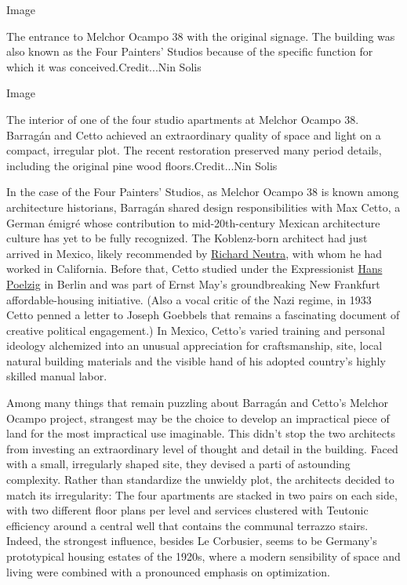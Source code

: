 Image

The entrance to Melchor Ocampo 38 with the original signage. The
building was also known as the Four Painters' Studios because of the
specific function for which it was conceived.Credit...Nin Solis

Image

The interior of one of the four studio apartments at Melchor Ocampo 38.
Barragán and Cetto achieved an extraordinary quality of space and light
on a compact, irregular plot. The recent restoration preserved many
period details, including the original pine wood floors.Credit...Nin
Solis

In the case of the Four Painters' Studios, as Melchor Ocampo 38 is known
among architecture historians, Barragán shared design responsibilities
with Max Cetto, a German émigré whose contribution to mid-20th-century
Mexican architecture culture has yet to be fully recognized. The
Koblenz-born architect had just arrived in Mexico, likely recommended by
\href{https://www.nytimes3xbfgragh.onion/1970/04/18/archives/richard-neutra-architect-dies-helped-shape-modern-outlook.html}{Richard
Neutra}, with whom he had worked in California. Before that, Cetto
studied under the Expressionist
\href{https://www.nytimes3xbfgragh.onion/1936/06/16/archives/hans-poelzig-dead-german-architect-placed-in-background-by-nazis.html}{Hans
Poelzig} in Berlin and was part of Ernst May's groundbreaking New
Frankfurt affordable-housing initiative. (Also a vocal critic of the
Nazi regime, in 1933 Cetto penned a letter to Joseph Goebbels that
remains a fascinating document of creative political engagement.) In
Mexico, Cetto's varied training and personal ideology alchemized into an
unusual appreciation for craftsmanship, site, local natural building
materials and the visible hand of his adopted country's highly skilled
manual labor.

Among many things that remain puzzling about Barragán and Cetto's
Melchor Ocampo project, strangest may be the choice to develop an
impractical piece of land for the most impractical use imaginable. This
didn't stop the two architects from investing an extraordinary level of
thought and detail in the building. Faced with a small, irregularly
shaped site, they devised a parti of astounding complexity. Rather than
standardize the unwieldy plot, the architects decided to match its
irregularity: The four apartments are stacked in two pairs on each side,
with two different floor plans per level and services clustered with
Teutonic efficiency around a central well that contains the communal
terrazzo stairs. Indeed, the strongest influence, besides Le Corbusier,
seems to be Germany's prototypical housing estates of the 1920s, where a
modern sensibility of space and living were combined with a pronounced
emphasis on optimization.

